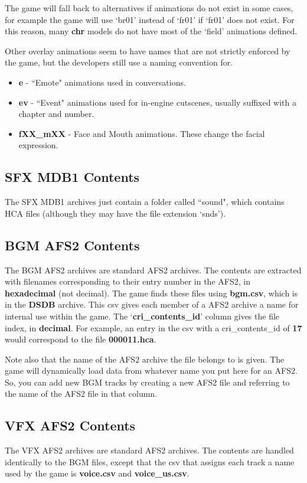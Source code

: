 \documentclass{article}
\begin{document}
The game will fall back to alternatives if animations do not exist in some cases, for example the game will use `br01' instead of `fr01' if `fr01' does not exist. For this reason, many \textbf{chr} models do not have most of the `field' animations defined.

Other overlay animations seem to have names that are not strictly enforced by the game, but the developers still use a naming convention for.
\begin{itemize}
\item \textbf{e} - ``Emote" animations used in conversations.
\item \textbf{ev} - ``Event" animations used for in-engine cutscenes, usually suffixed with a chapter and number.
\item \textbf{fXX\_mXX} - Face and Mouth animations. These change the facial expression.
\end{itemize}

\subsection{SFX MDB1 Contents}
The SFX MDB1 archives just contain a folder called ``sound", which contains HCA files (although they may have the file extension `snds'). 

\subsection{BGM AFS2 Contents}
The BGM AFS2 archives are standard AFS2 archives. The contents are extracted with filenames corresponding to their entry number in the AFS2, in \textbf{hexadecimal} (not decimal). The game finds these files using \textbf{bgm.csv}, which is in the \textbf{DSDB} archive. This csv gives each member of a AFS2 archive a name for internal use within the game.  The `\textbf{cri\_contents\_id}' column gives the file index, in \textbf{decimal}. For example, an entry in the csv with a cri\_contents\_id of \textbf{17} would correspond to the file \textbf{000011.hca}.

Note also that the name of the AFS2 archive the file belongs to is given. The game will dynamically load data from whatever name you put here for an AFS2. So, you can add new BGM tracks by creating a new AFS2 file and referring to the name of the AFS2 file in that column.

\subsection{VFX AFS2 Contents}
The VFX AFS2 archives are standard AFS2 archives. The contents are handled identically to the BGM files, except that the csv that assigns each track a name used by the game is \textbf{voice.csv} and \textbf{voice\_us.csv}.
\newpage
\end{document}
